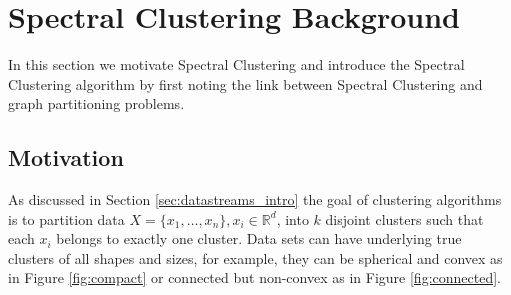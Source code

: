 


\section{Spectral Clustering Background}
\label{sec:sc_background}
In this section we motivate Spectral Clustering and introduce the Spectral Clustering algorithm by first noting the link between Spectral Clustering and graph partitioning problems. 

\subsection{Motivation}

As discussed in Section \ref{sec:datastreams_intro} the goal of clustering algorithms is to partition data  $X = \{ x_1, \ldots, x_n \}, x_i \in \mathbb{R}^d$, into $k$ disjoint clusters such that each $x_i$ belongs to exactly one cluster. Data sets can have underlying true clusters of all shapes and sizes, for example, they can be spherical and convex as in Figure \ref{fig:compact} or connected but non-convex as in Figure \ref{fig:connected}.

